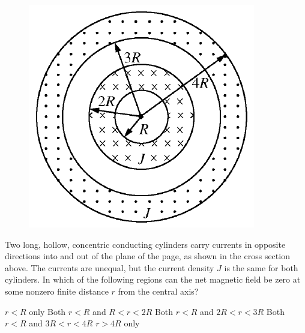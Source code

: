 \begin{figure}[H]
\centering
\includegraphics[scale=0.7]{images/19.png}
\end{figure}

\begin{questions}\setcounter{question}{18}\question
Two long, hollow, concentric conducting cylinders carry currents in opposite directions into and out of the plane of the page, as shown in the cross section above. The currents are unequal, but the current density $J$ is the same for both cylinders. In which of the following regions can the net magnetic field be zero at some nonzero finite distance $r$ from the central axis?

\begin{choices}
\choice $r<R$ only
\choice Both $r<R$ and $R<r<2 R$
\choice Both $r<R$ and $2 R<r<3 R$
\choice Both $r<R$ and $3 R<r<4 R$
\choice $r>4 R$ only
\end{choices}\end{questions}
